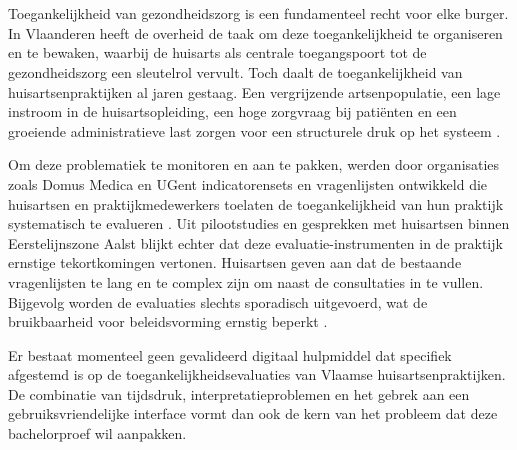 \section{}%
\label{sec:probleemstelling}

Toegankelijkheid van gezondheidszorg is een fundamenteel recht voor elke burger. In Vlaanderen
heeft de overheid de taak om deze toegankelijkheid te organiseren en te bewaken, waarbij de
huisarts als centrale toegangspoort tot de gezondheidszorg een sleutelrol vervult. Toch daalt
de toegankelijkheid van huisartsenpraktijken al jaren gestaag. Een vergrijzende artsenpopulatie,
een lage instroom in de huisartsopleiding, een hoge zorgvraag bij patiënten en een groeiende
administratieve last zorgen voor een structurele druk op het systeem \autocite{Rampelberg2025}.
\medskip

Om deze problematiek te monitoren en aan te pakken, werden door organisaties zoals Domus Medica
en UGent indicatorensets en vragenlijsten ontwikkeld die huisartsen en praktijkmedewerkers
toelaten de toegankelijkheid van hun praktijk systematisch te evalueren \autocite{Merckx2023}. Uit pilootstudies en
gesprekken met huisartsen binnen Eerstelijnszone Aalst blijkt echter dat deze evaluatie-instrumenten
in de praktijk ernstige tekortkomingen vertonen. Huisartsen geven aan dat de bestaande vragenlijsten
te lang en te complex zijn om naast de consultaties in te vullen. Bijgevolg worden de evaluaties
slechts sporadisch uitgevoerd, wat de bruikbaarheid voor beleidsvorming ernstig beperkt \autocite{Rampelberg2025a}.
\medskip

Er bestaat momenteel geen gevalideerd digitaal hulpmiddel dat specifiek afgestemd is op de
toegankelijkheidsevaluaties van Vlaamse huisartsenpraktijken. De combinatie van tijdsdruk,
interpretatieproblemen en het gebrek aan een gebruiksvriendelijke interface vormt dan ook de kern
van het probleem dat deze bachelorproef wil aanpakken.



